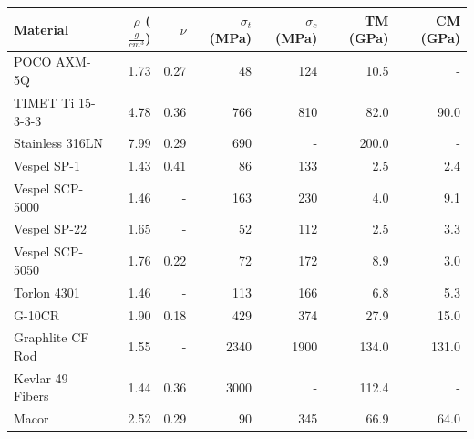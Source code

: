 \documentclass[final]{svjour2}
\begin{document}
\begin{table}[htb]%
\begin{threeparttable}
\begin{tabular}{lrrrrrr}
\toprule
\textbf{Material} & $\rho$ ($\frac{g}{cm^3}$) & $\nu$ & $\sigma_{t}$ (MPa) & $\sigma_{c}$ (MPa) & TM (GPa) & CM (GPa) \\
\midrule
 POCO AXM-5Q & 1.73 & 0.27 & 48\tnote{U} & 124\tnote{U} & 10.5 & - \\
 TIMET Ti 15-3-3-3 & 4.78 & 0.36 & 766\tnote{Y} & 810\tnote{Y} & 82.0 & 90.0\\
 Stainless 316LN & 7.99 & 0.29 & 690\tnote{Y} & - & 200.0 & - \\
 Vespel SP-1 & 1.43 & 0.41 & 86 & 133\tnote{*} & 2.5\tnote{\dag} & 2.4 \\
 Vespel SCP-5000 & 1.46 & - & 163 & 230\tnote{*} & 4.0 & 9.1 \\
 Vespel SP-22 & 1.65 & - & 52 & 112\tnote{*} & 2.5 & 3.3 \\
 Vespel SCP-5050 & 1.76 & 0.22 & 72 & 172\tnote{*} & 8.9 & 3.0 \\
 Torlon 4301 & 1.46 & - & 113\tnote{U} & 166\tnote{U} & 6.8 & 5.3 \\
 G-10CR & 1.90 & 0.18 & 429\tnote{U} & 374\tnote{U} & 27.9 & 15.0 \\
 Graphlite CF Rod & 1.55 & -  & 2340 & 1900 & 134.0 & 131.0 \\
 Kevlar 49 Fibers & 1.44 & 0.36 & 3000\tnote{U} & - & 112.4 & - \\
 Macor & 2.52 & 0.29 & 90\tnote{U} & 345\tnote{U} & 66.9 & 64.0 \\


\end{tabular}
\end{threeparttable}
\end{table}
\end{document}
